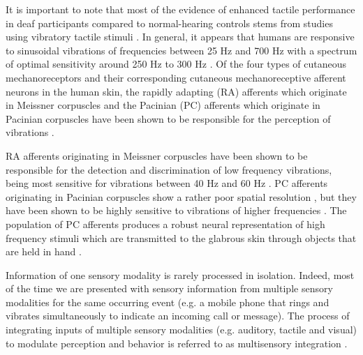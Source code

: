 \documentclass[12pt]{article}
\begin{document}
\par It is important to note that most of the evidence of enhanced tactile performance in deaf participants compared to normal-hearing controls stems from studies using vibratory tactile stimuli \parencite{levanen_feeling_2001,schiff_deaf_1972}. In general, it appears that humans are responsive to sinusoidal vibrations of frequencies between 25 Hz and 700 Hz with a spectrum of optimal sensitivity around 250 Hz to 300 Hz \parencite{perez_two-point_2000, verrillo_vibrotactile_1966}. Of the four types of cutaneous mechanoreceptors and their corresponding cutaneous mechanoreceptive afferent neurons in the human skin, the rapidly adapting (RA) afferents which originate in Meissner corpuscles and the Pacinian (PC) afferents which originate in Pacinian corpuscles have been shown to be responsible for the perception of vibrations \parencite{johnson_tactile_2000,johnson_roles_2001}. 
%
\par RA afferents originating in Meissner corpuscles have been shown to be responsible for the detection and discrimination of low frequency vibrations, being most sensitive for vibrations between 40 Hz and 60 Hz \parencite{lamotte_capacities_1975,mountcastle_detection_1972,talbot_sense_1968}. PC afferents originating in Pacinian corpuscles show a rather poor spatial resolution \parencite{phillips_tactile_1981}, but they have been shown to be highly sensitive to vibrations of higher frequencies \parencite{lindblom_discharge_1966,mountcastle_detection_1972,sato_response_1961}. The population of PC afferents produces a robust neural representation of high frequency stimuli which are transmitted to the glabrous skin through objects that are held in hand \parencite{brisben_detection_1999, hunt_nature_1961, johnson_roles_2001}.
\par Information of one sensory modality is rarely processed in isolation. Indeed, most of the time we are presented with sensory information from multiple sensory modalities for the same occurring event (e.g. a mobile phone that rings and vibrates simultaneously to indicate an incoming call or message). The process of integrating inputs of multiple sensory modalities (e.g. auditory, tactile and visual) to modulate perception and behavior is referred to as multisensory integration \parencite{calvert_handbook_2004, ernst_merging_2004,stein_merging_1993}. 
%
\end{document}
